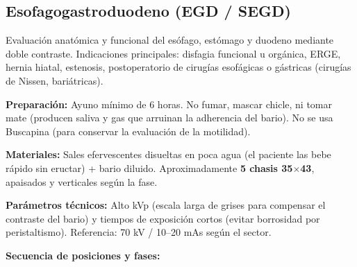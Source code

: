\subsection*{Esofagogastroduodeno (EGD / SEGD)}

Evaluación anatómica y funcional del esófago, estómago y duodeno mediante doble contraste. Indicaciones principales: disfagia funcional u orgánica, ERGE, hernia hiatal, estenosis, postoperatorio de cirugías esofágicas o gástricas (cirugías de Nissen, bariátricas).

\textbf{Preparación:} Ayuno mínimo de 6 horas. No fumar, mascar chicle, ni tomar mate (producen saliva y gas que arruinan la adherencia del bario). No se usa Buscapina (para conservar la evaluación de la motilidad).

\textbf{Materiales:} Sales efervescentes disueltas en poca agua (el paciente las bebe rápido sin eructar) + bario diluido. Aproximadamente \textbf{5 chasis 35$\times$43}, apaisados y verticales según la fase.

\textbf{Parámetros técnicos:} Alto kVp (escala larga de grises para compensar el contraste del bario) y tiempos de exposición cortos (evitar borrosidad por peristaltismo). Referencia: 70 kV / 10--20 mAs según el sector.

\clearpage

\textbf{Secuencia de posiciones y fases:}

